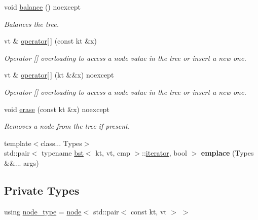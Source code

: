 \begin{DoxyCompactItemize}
void \hyperlink{classbst_a4ac74357616de45d5d3e7cbb9850854e}{balance} () noexcept
\begin{DoxyCompactList}\small\item\em Balances the tree. \end{DoxyCompactList}\item 
vt \& \hyperlink{classbst_ab1a1eec5b236a7fbd9c6da8d65786b10}{operator\mbox{[}$\,$\mbox{]}} (const kt \&x)
\begin{DoxyCompactList}\small\item\em Operator \mbox{[}\mbox{]} overloading to access a node value in the tree or insert a new one. \end{DoxyCompactList}\item 
vt \& \hyperlink{classbst_a024d828ac753881e50cd7cc93a47a3cc}{operator\mbox{[}$\,$\mbox{]}} (kt \&\&x) noexcept
\begin{DoxyCompactList}\small\item\em Operator \mbox{[}\mbox{]} overloading to access a node value in the tree or insert a new one. \end{DoxyCompactList}\item 
void \hyperlink{classbst_af5ed588b2c686b3b53a2b5466a617f73}{erase} (const kt \&x) noexcept
\begin{DoxyCompactList}\small\item\em Removes a node from the tree if present. \end{DoxyCompactList}\item 
\mbox{\label{classbst_afcc3983e4d16eaa758aec0adb71759bb}} 
{\footnotesize template$<$class... Types$>$ }\\std\+::pair$<$ typename \hyperlink{classbst}{bst}$<$ kt, vt, cmp $>$\+::\hyperlink{classbst_a429b0445783ff6486882db5dee900ce0}{iterator}, bool $>$ {\bfseries emplace} (Types \&\&... args)
\end{DoxyCompactItemize}
\subsection*{Private Types}
\begin{DoxyCompactItemize}
\item 
using \hyperlink{classbst_a062eb2a1ac54802dbc4f0f74ae2afd01}{node\+\_\+type} = \hyperlink{structbst_1_1node}{node}$<$ std\+::pair$<$ const kt, vt $>$ $>$
\end{DoxyCompactItemize}
